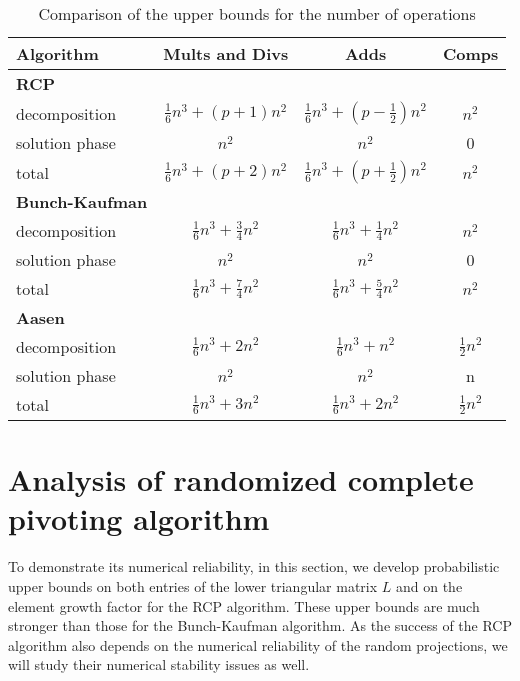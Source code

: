 \documentclass[11pt]{article}
\begin{document}
    \begin{table}[htbp]
    \centering
    \caption{Comparison of the upper bounds for the number of operations}\label{Tb:Flops of RCP BK and Aasen}
    \begin{tabular}{|l|c|c|c|}
    \hline
  Algorithm & Mults and Divs & Adds & Comps \\
  \hline
  \multicolumn{1}{|l|}{\textbf{RCP}} & & &  \\
  \quad decomposition & $\frac{1}{6} n^3 + (p + 1) n^2 $  & $\frac{1}{6} n^3 + (p - \frac{1}{2}) n^2 $ & $n^2$  \\[3pt]
  \quad solution phase &  $n^2 $ & $n^2 $  &  0 \\[3pt]
  \quad total & $\frac{1}{6} n^3 + (p + 2) n^2 $  & $\frac{1}{6} n^3 + (p + \frac{1}{2}) n^2 $ & $n^2$  \\[3pt]
  \hline 
  \multicolumn{1}{|l|}{\textbf{Bunch-Kaufman}} & & &  \\
  \quad decomposition & $\frac{1}{6} n^3 + \frac{3}{4} n^2 $ & $\frac{1}{6} n^3 + \frac{1}{4} n^2 $ & $n^2 $ \\[3pt]
  \quad solution phase & $n^2 $  & $n^2 $ & 0  \\[3pt]
  \quad total & $\frac{1}{6} n^3 + \frac{7}{4} n^2 $  & $\frac{1}{6} n^3 + \frac{5}{4} n^2 $  & $n^2 $  \\[3pt]
  \hline 
  \multicolumn{1}{|l|}{\textbf{Aasen}} & & &  \\
  \quad decomposition & $\frac{1}{6} n^3 + 2 n^2 $ & $\frac{1}{6} n^3 +  n^2 $ & $\frac{1}{2} n^2 $ \\[3pt]
  \quad solution phase & $n^2 $  & $n^2 $ & n  \\[3pt]
  \quad total & $\frac{1}{6} n^3 + 3 n^2 $  & $\frac{1}{6} n^3 + 2 n^2 $  & $\frac{1}{2} n^2 $  \\[3pt]
  \hline
  \end{tabular}
  \end{table}

\section{Analysis of randomized complete pivoting algorithm}\label{Sec:Analysis of RCP}
To demonstrate its numerical reliability, in this section, we develop probabilistic upper bounds on both entries of the lower triangular matrix $L$ and on the element growth factor for the RCP algorithm. These upper bounds are much stronger than those for the Bunch-Kaufman algorithm. As the success of the RCP algorithm also depends on the numerical reliability of the random projections, we will study their numerical stability issues as well. 
\end{document}
